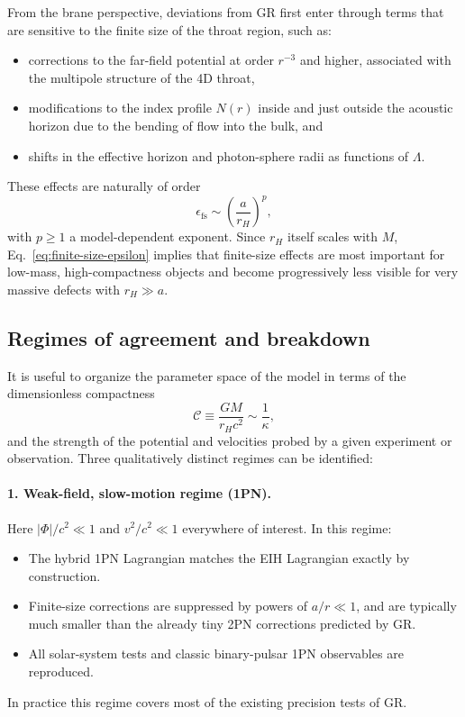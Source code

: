 \documentclass[11pt]{article}
\begin{document}
From the brane perspective, deviations from GR first enter through terms
that are sensitive to the finite size of the throat region, such as:
\begin{itemize}
  \item corrections to the far-field potential at order \(r^{-3}\) and
        higher, associated with the multipole structure of the 4D throat,
  \item modifications to the index profile \(N(r)\) inside and just outside
        the acoustic horizon due to the bending of flow into the bulk, and
  \item shifts in the effective horizon and photon-sphere radii as functions
        of \(\Lambda\).
\end{itemize}
These effects are naturally of order
\begin{equation}
  \epsilon_{\text{fs}}
  \sim \left( \frac{a}{r_H} \right)^p,
  \label{eq:finite-size-epsilon}
\end{equation}
with \(p \geq 1\) a model-dependent exponent.  Since \(r_H\) itself scales
with \(M\), Eq.~\eqref{eq:finite-size-epsilon} implies that finite-size
effects are most important for low-mass, high-compactness objects and become
progressively less visible for very massive defects with \(r_H \gg a\).

\subsection{Regimes of agreement and breakdown}
\label{subsec:predictions-regimes}

It is useful to organize the parameter space of the model in terms of the
dimensionless compactness
\begin{equation}
  \mathcal{C}
  \equiv \frac{G M}{r_H c^2}
  \sim \frac{1}{\kappa},
  \label{eq:compactness}
\end{equation}
and the strength of the potential and velocities probed by a given
experiment or observation.  Three qualitatively distinct regimes can be
identified:

\paragraph{1. Weak-field, slow-motion regime (1PN).}
Here \(|\Phi|/c^2 \ll 1\) and \(v^2/c^2 \ll 1\) everywhere of interest.  In
this regime:
\begin{itemize}
  \item The hybrid 1PN Lagrangian matches the EIH Lagrangian exactly by
        construction.
  \item Finite-size corrections are suppressed by powers of
        \(a/r \ll 1\), and are typically much smaller than the already tiny
        2PN corrections predicted by GR.
  \item All solar-system tests and classic binary-pulsar 1PN observables are
        reproduced.
\end{itemize}
In practice this regime covers most of the existing precision tests of GR.
\end{document}
